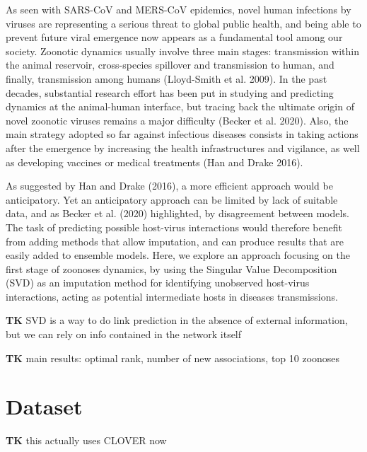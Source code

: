\documentclass[11pt]{article}
\begin{document}
As seen with SARS-CoV and MERS-CoV epidemics, novel human infections by
viruses are representing a serious threat to global public health, and
being able to prevent future viral emergence now appears as a
fundamental tool among our society. Zoonotic dynamics usually involve
three main stages: transmission within the animal reservoir,
cross-species spillover and transmission to human, and finally,
transmission among humans (Lloyd-Smith et al. 2009). In the past
decades, substantial research effort has been put in studying and
predicting dynamics at the animal-human interface, but tracing back the
ultimate origin of novel zoonotic viruses remains a major difficulty
(Becker et al. 2020). Also, the main strategy adopted so far against
infectious diseases consists in taking actions after the emergence by
increasing the health infrastructures and vigilance, as well as
developing vaccines or medical treatments (Han and Drake 2016).

As suggested by Han and Drake (2016), a more efficient approach would be
anticipatory. Yet an anticipatory approach can be limited by lack of
suitable data, and as Becker et al. (2020) highlighted, by disagreement
between models. The task of predicting possible host-virus interactions
would therefore benefit from adding methods that allow imputation, and
can produce results that are easily added to ensemble models. Here, we
explore an approach focusing on the first stage of zoonoses dynamics, by
using the Singular Value Decomposition (SVD) as an imputation method for
identifying unobserved host-virus interactions, acting as potential
intermediate hosts in diseases transmissions.

\textbf{TK} SVD is a way to do link prediction in the absence of
external information, but we can rely on info contained in the network
itself

\textbf{TK} main results: optimal rank, number of new associations, top
10 zoonoses

\hypertarget{dataset}{%
\section{Dataset}\label{dataset}}

\textbf{TK} this actually uses CLOVER now
\end{document}
